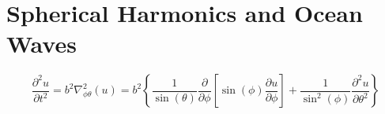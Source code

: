 \chapter{Spherical Harmonics and Ocean Waves}
\begin{comment}
Physics Archives
\end{comment}
$$\frac{\partial^2u}{\partial t^2} = b^2\nabla^2_{\phi\theta}(u) = b^2\left\{\frac{1}{\sin(\theta)}\frac{\partial}{\partial \phi}\left[\sin(\phi)\frac{\partial u}{\partial \phi}\right] + \frac{1}{\sin^2(\phi)}\frac{\partial^2u}{\partial \theta^2}\right\}$$

